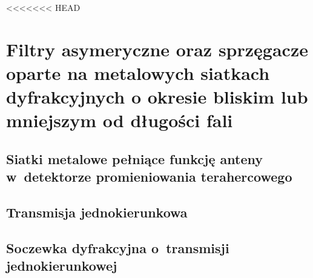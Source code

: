 <<<<<<< HEAD
\chapter{Filtry asymeryczne oraz \mbox{sprzęgacze} \mbox{oparte} na \mbox{metalowych} \mbox{siatkach} \mbox{dyfrakcyjnych} o \mbox{okresie} \mbox{bliskim} lub \mbox{mniejszym} od \mbox{długości} \mbox{fali}}
\label{chap:thz}


\section{Siatki metalowe pełniące funkcję anteny w~detektorze promieniowania terahercowego}


\section{Transmisja jednokierunkowa}

\section{Soczewka dyfrakcyjna o~transmisji jednokierunkowej}

